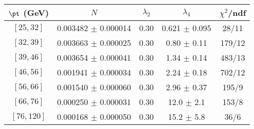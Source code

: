 \begin{tabular}{c||c|c|c|c}
$\pt$ (GeV) & $N$ & $\lambda_{2}$ & $\lambda_4$  & $\chi^2$/ndf  \\
\hline
$[25, 32]$ & 0.003482 $\pm$ 0.000014 & 0.30 & 0.621 $\pm$ 0.095 & 28/11\\
$[32, 39]$ & 0.003663 $\pm$ 0.000025 & 0.30 & 0.80 $\pm$ 0.11 & 179/12\\
$[39, 46]$ & 0.003654 $\pm$ 0.000041 & 0.30 & 1.34 $\pm$ 0.14 & 483/13\\
$[46, 56]$ & 0.001941 $\pm$ 0.000034 & 0.30 & 2.24 $\pm$ 0.18 & 702/12\\
$[56, 66]$ & 0.001540 $\pm$ 0.000060 & 0.30 & 2.96 $\pm$ 0.37 & 195/9\\
$[66, 76]$ & 0.000250 $\pm$ 0.000031 & 0.30 & 12.0 $\pm$ 2.1 & 153/8\\
$[76, 120]$ & 0.000168 $\pm$ 0.000050 & 0.30 & 15.2 $\pm$ 5.8 & 36/6\\
\end{tabular}
